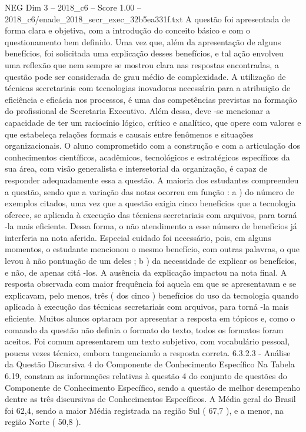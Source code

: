 \begin{textsample}{NEG Dim 3 – 2018\_c6 – Score 1.00 – 2018\_c6/enade\_2018\_secr\_exec\_32b5ea331f.txt}
A questão foi apresentada de forma clara e objetiva, com a introdução do conceito básico e com o questionamento bem definido.
Uma vez que, além da apresentação de alguns benefícios, foi solicitada uma explicação desses benefícios, e tal ação envolveu uma reflexão que nem sempre se mostrou clara nas respostas encontradas, a questão pode ser considerada de grau médio de complexidade.
A utilização de técnicas secretariais com tecnologias inovadoras necessária para a atribuição de eficiência e eficácia nos processos, é uma das competências previstas na formação do profissional de Secretaria Executivo.
Além dessa, deve -se mencionar a capacidade de ter um raciocínio lógico, crítico e analítico, que opere com valores e que estabeleça relações formais e causais entre fenômenos e situações organizacionais.
O aluno comprometido com a construção e com a articulação dos conhecimentos científicos, acadêmicos, tecnológicos e estratégicos específicos da sua área, com visão generalista e intersetorial da organização, é capaz de responder adequadamente essa a questão.
A maioria dos estudantes compreendeu a questão, sendo que a variação das notas ocorreu em função : a ) do número de exemplos citados, uma vez que a questão exigia cinco benefícios que a tecnologia oferece, se aplicada à execução das técnicas secretariais com arquivos, para torná -la mais eficiente.
Dessa forma, o não atendimento a esse número de benefícios já interferia na nota aferida.
Especial cuidado foi necessário, pois, em alguns momentos, o estudante mencionou o mesmo benefício, com outras palavras, o que levou à não pontuação de um deles ; b ) da necessidade de explicar os benefícios, e não, de apenas citá -los.
A ausência da explicação impactou na nota final.
A resposta observada com maior frequência foi aquela em que se apresentavam e se explicavam, pelo menos, três ( dos cinco ) benefícios do uso da tecnologia quando aplicada à execução das técnicas secretariais com arquivos, para torná -la mais eficiente.
Muitos alunos optaram por apresentar a resposta em tópicos e, como o comando da questão não definia o formato do texto, todos os formatos foram aceitos.
Foi comum apresentarem um texto subjetivo, com vocabulário pessoal, poucas vezes técnico, embora tangenciando a resposta correta. 6.3.2.3 - Análise da Questão Discursiva 4 do Componente de Conhecimento Específico Na Tabela 6.19, constam as informações relativas à questão 4 do conjunto de questões do Componente de Conhecimento Específico, sendo a questão de melhor desempenho dentre as três discursivas de Conhecimentos Específicos.
A Média geral do Brasil foi 62,4, sendo a maior Média registrada na região Sul ( 67,7 ), e a menor, na região Norte ( 50,8 ).

\end{textsample}
